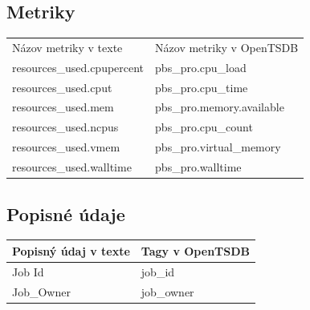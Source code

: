 \documentclass[printed,11pt,twoside,color,cover,table]{fithesis3}
\begin{document}
\subsection{Metriky}
\begin{center}
    \begin{tabular}{| l | l |}
    \hline
    Názov metriky v texte & Názov metriky v OpenTSDB\\
	resources\_used.cpupercent & pbs\_pro.cpu\_load\\ \hline
    resources\_used.cput & pbs\_pro.cpu\_time\\ \hline
    resources\_used.mem & pbs\_pro.memory.available\\ \hline
    resources\_used.ncpus & pbs\_pro.cpu\_count\\ \hline 
    resources\_used.vmem & pbs\_pro.virtual\_memory\\ \hline
    resources\_used.walltime & pbs\_pro.walltime\\ \hline
    \end{tabular}
\end{center}

\subsection{Popisné údaje}
\begin{center}
    \begin{tabular}{| l | l |}
    \hline
    Popisný údaj v texte & Tagy v OpenTSDB \\ \hline
    Job Id & job\_id\\ \hline
    Job\_Owner & job\_owner\\ \hline
    \end{tabular}
\end{center}
\end{document}
